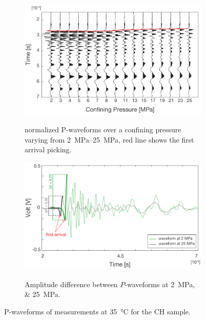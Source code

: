 \begin{figure}[!hb]
        \centering
        \begin{subfigure}[b]{.5\textwidth}
                \caption{normalized P-waveforms over a confining pressure
varying from \SIrange[range-units = single]{2}{25}{\mega\pascal}, red line shows
the first arrival picking.}
                \includegraphics[width=\textwidth]{fig/waveform_a.pdf}
                \label{fig:waveform_a}
        \end{subfigure}%

        \begin{subfigure}[b]{.5\textwidth}
                \caption{Amplitude difference between $P$-waveforms at
\SIlist{2;25}{\mega\pascal}.}
                \includegraphics[width=\textwidth]{fig/waveform_b.pdf}
                \label{fig:waveform_b}
        \end{subfigure}

        \caption{P-waveforms of measurements at \SI{35}{\degreeCelsius} for the
CH sample.}
\end{figure}
